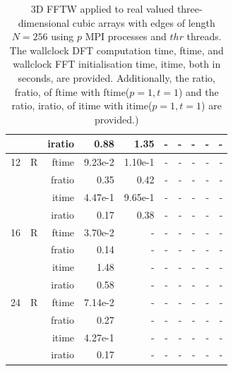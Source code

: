 \documentclass[a4paper]{article}
\begin{document}
\begin{table}[htbp]
\begin{center}
\begin{small}
\begin{tabular}{|r|r|r|r|r|r|r|r|r|r|}
             &             &  iratio &    0.88 &   1.35  &      - &      - &      - &      - &      - \\\hline
   12 &   R &   ftime &    9.23e-2 &    1.10e-1 &      - &      - &      - &      - &      - \\
             &             &  fratio &    0.35 &   0.42 &      - &      - &      - &      - &      - \\
             &             &  itime &    4.47e-1 &    9.65e-1 &      - &      - &      - &      - &      - \\
             &             &  iratio &    0.17 &    0.38 &      - &      - &      - &      - &      - \\\hline
   16 &   R &   ftime &    3.70e-2 &      - &      - &      - &      - &      - &      - \\
             &             &  fratio &    0.14 &      - &      - &      - &      - &      - &      - \\
             &             &  itime &    1.48  &      - &      - &      - &      - &      - &      - \\
             &             &  iratio &    0.58 &      - &      - &      - &      - &      - &      - \\\hline
   24 &   R &   ftime &    7.14e-2 &      - &      - &      - &      - &      - &      - \\
             &             &  fratio &    0.27 &      - &      - &      - &      - &      - &      - \\
             &             &  itime &    4.27e-1 &      - &      - &      - &      - &      - &      - \\
             &             &  iratio &    0.17 &      - &      - &      - &      - &      - &      - \\\hline
\end{tabular}
\caption{3D FFTW applied to real valued three-dimensional cubic arrays with edges of length $N=256$ using $p$ MPI processes and $thr$ threads. The wallclock DFT computation time, ftime, and wallclock FFT initialisation time, itime, both in seconds, are provided. Additionally, the ratio, fratio, of ftime  with ftime($p=1,t=1$) and the ratio, iratio, of itime  with itime($p=1,t=1$) are provided.) }\label{Tbl:FFTW3d256}
\end{small}
\end{center}
\end{table}
\end{document}
